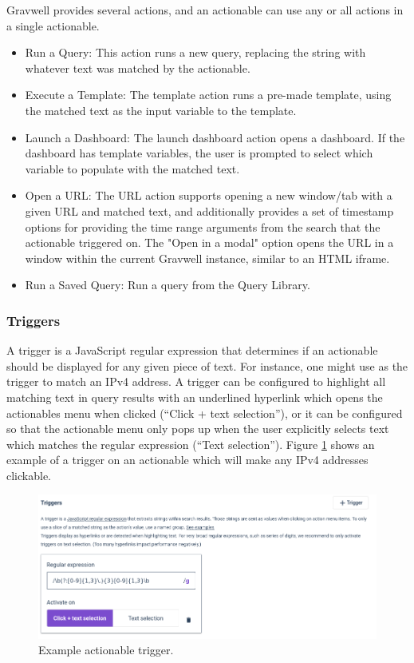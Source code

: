 Gravwell provides several actions, and an actionable can use any or all actions in a single actionable. 

\begin{itemize}
\item Run a Query: This action runs a new query, replacing the string  with whatever text was matched by the actionable.
\item Execute a Template: The template action runs a pre-made template, using the matched text as the input variable to the template. 
\item Launch a Dashboard: The launch dashboard action opens a dashboard. If the dashboard has template variables, the user is prompted to select which variable to populate with the matched text.
\item Open a URL: The URL action supports opening a new window/tab with a given URL and matched text, and additionally provides a set of timestamp options for providing the time range arguments from the search that the actionable triggered on.  The "Open in a modal" option opens the URL in a window within the current Gravwell instance, similar to an HTML iframe.
\item Run a Saved Query: Run a query from the Query Library. 
\end{itemize}


\subsubsection{Triggers}

A trigger is a JavaScript regular expression that determines if an actionable should be displayed for any given piece of text. For instance, one might use  as the trigger to match an IPv4 address. A trigger can be configured to highlight all matching text in query results with an underlined hyperlink which opens the actionables menu when clicked (``Click + text selection''), or it can be configured so that the actionable menu only pops up when the user explicitly selects text which matches the regular expression (``Text selection''). Figure \ref{fig:trigger} shows an example of a trigger on an actionable which will make any IPv4 addresses clickable.

\begin{figure}
	\includegraphics[width=0.9\linewidth]{images/trigger.png}
	\caption{Example actionable trigger.}
	\label{fig:trigger}
\end{figure}

